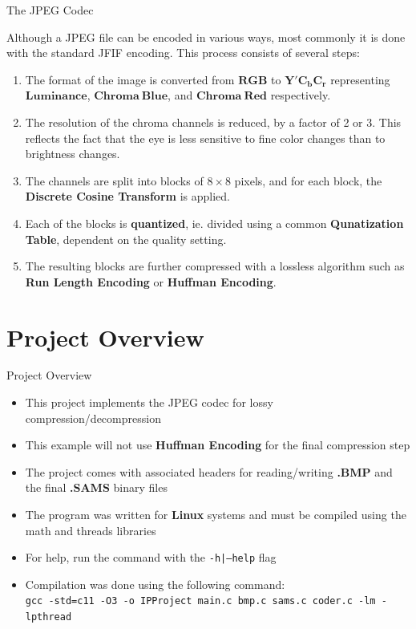 \documentclass[10pt]{beamer}
\begin{document}
\begin{frame}{The JPEG Codec}

    Although a JPEG file can be encoded in various ways, most commonly it is done with the standard JFIF encoding. This process consists of several steps:
    \begin{enumerate}
     \item The format of the image is converted from $\bm{RGB}$ to  $\bm{Y'C_bC_r}$ representing $\bm{Luminance}$, $\bm{Chroma\ Blue}$, and $\bm{Chroma\ Red}$ respectively.
     \item The resolution of the chroma channels is reduced, by a factor of 2 or 3. This reflects the fact that the eye is less sensitive to fine color changes than to brightness changes.
     \item The channels are split into blocks of $8\times8$ pixels, and for each block, the \textbf{Discrete Cosine Transform} is applied.
     \item Each of the blocks is \textbf{quantized}, ie. divided using a common \textbf{Qunatization Table}, dependent on the quality setting.
     \item The resulting blocks are further compressed with a lossless algorithm such as \textbf{Run Length Encoding} or \textbf{Huffman Encoding}.
    \end{enumerate}

\end{frame}


\section{Project Overview}

\begin{frame}{Project Overview}
    \begin{itemize}
     \item This project implements the JPEG codec for lossy compression/decompression
     \item This example will not use \textbf{Huffman Encoding} for the final compression step
     \item The project comes with associated headers for reading/writing \textbf{.BMP} and the final \textbf{.SAMS} binary files
     \item The program was written for \textbf{Linux} systems and must be compiled using the math and threads libraries
     \item For help, run the command with the \texttt{-h|--help} flag
     \item Compilation was done using the following command: \\
     \texttt{gcc -std=c11 -O3 -o IPProject main.c bmp.c sams.c coder.c -lm -lpthread}
    \end{itemize}
\end{frame}
\end{document}
